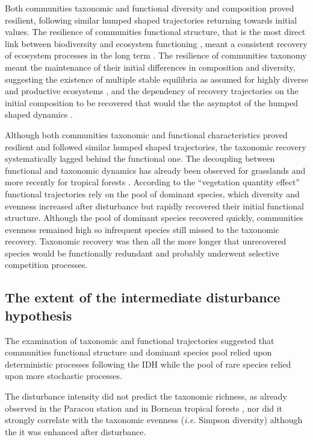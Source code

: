 \documentclass[fleqn,10pt]{ArtEcoFoG} %
\theoremstyle{definition}
\theoremstyle{definition}
\theoremstyle{definition}
\theoremstyle{remark}
\begin{document}
Both communities taxonomic and functional diversity and composition
proved resilient, following similar humped shaped trajectories returning
towards initial values. The resilience of communities functional
structure, that is the most direct link between biodiversity and
ecosystem functioning \citep{Diaz2005}, meant a consistent recovery of
ecosystem processes in the long term \citep{Guariguata2001}. The
resilience of communities taxonomy meant the maintenance of their
initial differences in composition and diversity, suggesting the
existence of multiple stable equilibria as assumed for highly diverse
and productive ecosystems \citep{Chase2003}, and the dependency of
recovery trajectories on the initial composition to be recovered that
would the the asymptot of the humped shaped dynamics
\citep{Hubbell1999, Molino2001, Anderson2007, Baraloto2012a}.

Although both communities taxonomic and functional characteristics
proved resilient and followed similar humped shaped trajectories, the
taxonomic recovery systematically lagged behind the functional one. The
decoupling between functional and taxonomic dynamics has already been
observed for grasslands \citep{Tilman1997, Mouillot2011} and more
recently for tropical forests \citep{Lohbeck2015, Guariguata2001}.
According to the ``vegetation quantity effect'' \citep{Grime1998}
functional trajectories rely on the pool of dominant species, which
diversity and evenness increased after disturbance but rapidly recovered
their initial functional structure. Although the pool of dominant
species recovered quickly, communities evenness remained high so
infrequent species still missed to the taxonomic recovery. Taxonomic
recovery was then all the more longer that unrecovered species would be
functionally redundant and probably underwent selective competition
processes.

\subsection{The extent of the intermediate disturbance
hypothesis}\label{the-extent-of-the-intermediate-disturbance-hypothesis}

The examination of taxonomic and functional trajectories suggested that
communities functional structure and dominant species pool relied upon
deterministic processes following the IDH while the pool of rare species
relied upon more stochastic processes.

The disturbance intensity did not predict the taxonomic richness, as
already observed in the Paracou station \citep{Baraloto2012a} and in
Bornean tropical forests \citep{Cannon1998}, nor did it strongly
correlate with the taxonomic evenness (\emph{i.e.} Simpson diversity)
although the it was enhanced after disturbance.
\end{document}

